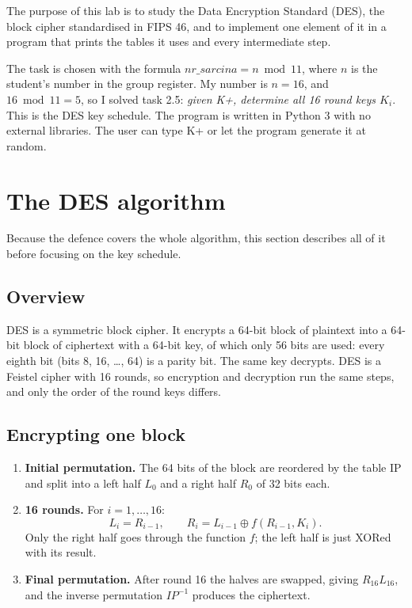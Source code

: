 \documentclass[11pt,a4paper]{article}
\begin{document}
\utmtitlepage
\tableofcontents
\newpage


The purpose of this lab is to study the Data Encryption Standard (DES), the block cipher
standardised in FIPS 46, and to implement one element of it in a program that prints the tables it
uses and every intermediate step.

The task is chosen with the formula $nr\_sarcina = n \bmod 11$, where $n$ is the student's number
in the group register. My number is $n = 16$, and $16 \bmod 11 = 5$, so I solved task 2.5:
\textit{given K+, determine all 16 round keys $K_i$}. This is the DES key schedule. The program is
written in Python 3 with no external libraries. The user can type K+ or let the program generate
it at random.

\section{The DES algorithm}

Because the defence covers the whole algorithm, this section describes all of it before focusing
on the key schedule.

\subsection{Overview}

DES is a symmetric block cipher. It encrypts a 64-bit block of plaintext into a 64-bit block of
ciphertext with a 64-bit key, of which only 56 bits are used: every eighth bit (bits 8, 16, \dots,
64) is a parity bit. The same key decrypts. DES is a Feistel cipher with 16 rounds, so encryption
and decryption run the same steps, and only the order of the round keys differs.

\subsection{Encrypting one block}

\begin{enumerate}
  \item \textbf{Initial permutation.} The 64 bits of the block are reordered by the table IP and
  split into a left half $L_0$ and a right half $R_0$ of 32 bits each.
  \item \textbf{16 rounds.} For $i = 1, \dots, 16$:
  \[
    L_i = R_{i-1}, \qquad R_i = L_{i-1} \oplus f(R_{i-1}, K_i).
  \]
  Only the right half goes through the function $f$; the left half is just XORed with its result.
  \item \textbf{Final permutation.} After round 16 the halves are swapped, giving $R_{16}L_{16}$,
  and the inverse permutation $IP^{-1}$ produces the ciphertext.
\end{enumerate}
\end{document}
